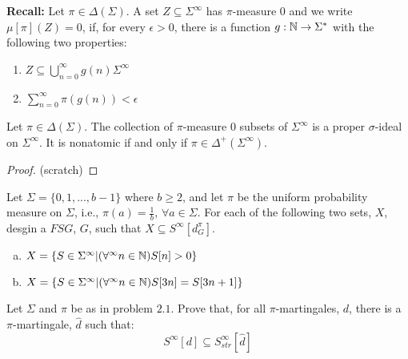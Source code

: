 \documentclass[../main.tex]{subfiles}
\begin{document}
\textbf{Recall:}
Let $\pi \in \Delta(\Sigma)$. A set $Z \subseteq \Sigma^{\infty}$ has $\pi$-measure
0 and we write $\mu[\pi](Z) = 0$, if, for every $\epsilon > 0$, there is a function
$g:\mathbb{N} \rightarrow \Sigma^{*}$ with the following two properties:
\begin{enumerate}
    \item $Z \subseteq \bigcup\limits_{n = 0}^{\infty} g(n) \Sigma^{\infty}$
    \item $\sum_{n=0}^{\infty} \pi(g(n)) < \epsilon$
\end{enumerate}

\begin{thm}
    Let $\pi \in \Delta(\Sigma)$. The collection of $\pi$-measure 0 subsets of
    $\Sigma^{\infty}$ is a proper $\sigma$-ideal on $\Sigma^{\infty}$. It is
    nonatomic if and only if $\pi \in \Delta^{+}(\Sigma^{\infty})$.
\end{thm}
\begin{proof}
    (scratch)
\end{proof}

\begin{problem}{2.1}
    Let $\Sigma = \{ 0, 1, ... , b - 1 \}$ where $b \geq 2$, and let $\pi$ be
    the uniform probability measure on $\Sigma$, i.e., $\pi(a) = \frac{1}{b}$,
    $\forall a \in \Sigma$. For each of the following two sets, $X$, desgin a
    $FSG$, $G$, such that $X \subseteq S^{\infty}[d^{\pi}_{G}]$.
    \begin{enumerate}[(a)]
        \item $X = \{ S \in \Sigma^{\infty} | (\forall^{\infty} n \in \mathbb{N}) S[n] > 0 \}$
        \item $X = \{ S \in \Sigma^{\infty} | (\forall^{\infty} n \in \mathbb{N}) S[3n] = S[3n + 1] \}$
    \end{enumerate}
\end{problem}

\begin{problem}{2.2}
    Let $\Sigma$ and $\pi$ be as in problem $2.1$. Prove that, for all
    $\pi$-martingales, $d$, there is a $\pi$-martingale, $\hat{d}$ such that:
    \begin{equation*}
        S^{\infty}[d] \subseteq S^{\infty}_{str}[\hat{d}]
    \end{equation*}
\end{problem}
\end{document}
